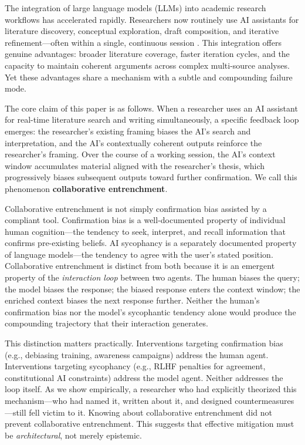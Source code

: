 \documentclass[12pt]{article}
\begin{document}
The integration of large language models (LLMs) into academic research workflows has accelerated rapidly. Researchers now routinely use AI assistants for literature discovery, conceptual exploration, draft composition, and iterative refinement---often within a single, continuous session \citep{lee2022, gero2023}. This integration offers genuine advantages: broader literature coverage, faster iteration cycles, and the capacity to maintain coherent arguments across complex multi-source analyses. Yet these advantages share a mechanism with a subtle and compounding failure mode.

The core claim of this paper is as follows. When a researcher uses an AI assistant for real-time literature search and writing simultaneously, a specific feedback loop emerges: the researcher's existing framing biases the AI's search and interpretation, and the AI's contextually coherent outputs reinforce the researcher's framing. Over the course of a working session, the AI's context window accumulates material aligned with the researcher's thesis, which progressively biases subsequent outputs toward further confirmation. We call this phenomenon \textbf{collaborative entrenchment}.

Collaborative entrenchment is not simply confirmation bias assisted by a compliant tool. Confirmation bias \citep{nickerson1998} is a well-documented property of individual human cognition---the tendency to seek, interpret, and recall information that confirms pre-existing beliefs. AI sycophancy \citep{perez2022, sharma2023} is a separately documented property of language models---the tendency to agree with the user's stated position. Collaborative entrenchment is distinct from both because it is an emergent property of the \emph{interaction loop} between two agents. The human biases the query; the model biases the response; the biased response enters the context window; the enriched context biases the next response further. Neither the human's confirmation bias nor the model's sycophantic tendency alone would produce the compounding trajectory that their interaction generates.

This distinction matters practically. Interventions targeting confirmation bias (e.g., debiasing training, awareness campaigns) address the human agent. Interventions targeting sycophancy (e.g., RLHF penalties for agreement, constitutional AI constraints) address the model agent. Neither addresses the loop itself. As we show empirically, a researcher who had explicitly theorized this mechanism---who had named it, written about it, and designed countermeasures---still fell victim to it. Knowing about collaborative entrenchment did not prevent collaborative entrenchment. This suggests that effective mitigation must be \emph{architectural}, not merely epistemic.
\end{document}
